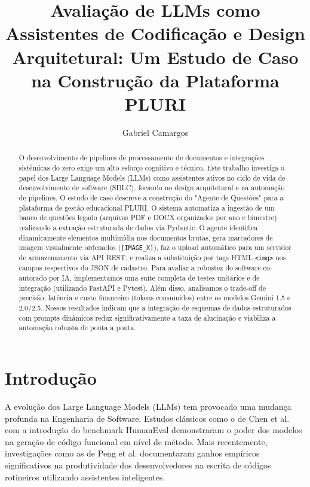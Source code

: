 \documentclass[sigconf]{acmart}
\begin{document}
\title{Avaliação de LLMs como Assistentes de Codificação e Design Arquitetural: Um Estudo de Caso na Construção da Plataforma PLURI}

\author{Gabriel Camargos}

\begin{abstract}
O desenvolvimento de pipelines de processamento de documentos e integrações sistêmicas do zero exige um alto esforço cognitivo e técnico. Este trabalho investiga o papel dos Large Language Models (LLMs) como assistentes ativos no ciclo de vida de desenvolvimento de software (SDLC), focando no design arquitetural e na automação de pipelines. O estudo de caso descreve a construção do "Agente de Questões" para a plataforma de gestão educacional PLURI. O sistema automatiza a ingestão de um banco de questões legado (arquivos PDF e DOCX organizados por ano e bimestre) realizando a extração estruturada de dados via Pydantic. O agente identifica dinamicamente elementos multimídia nos documentos brutas, gera marcadores de imagem visualmente ordenados (\lstinline{[IMAGE_X]}), faz o upload automático para um servidor de armazenamento via API REST, e realiza a substituição por tags HTML \lstinline{<img>} nos campos respectivos do JSON de cadastro. Para avaliar a robustez do software co-autorado por IA, implementamos uma suíte completa de testes unitários e de integração (utilizando FastAPI e Pytest). Além disso, analisamos o trade-off de precisão, latência e custo financeiro (tokens consumidos) entre os modelos Gemini 1.5 e 2.0/2.5. Nossos resultados indicam que a integração de esquemas de dados estruturados com prompts dinâmicos reduz significativamente a taxa de alucinação e viabiliza a automação robusta de ponta a ponta.
\end{abstract}


\maketitle

\section{Introdução}
A evolução dos Large Language Models (LLMs) tem provocado uma mudança profunda na Engenharia de Software. Estudos clássicos como o de Chen et al. \cite{chen2021evaluating} com a introdução do benchmark HumanEval demonstraram o poder dos modelos na geração de código funcional em nível de método. Mais recentemente, investigações como as de Peng et al. \cite{peng2023impact} documentaram ganhos empíricos significativos na produtividade dos desenvolvedores na escrita de códigos rotineiros utilizando assistentes inteligentes. 
\end{document}
